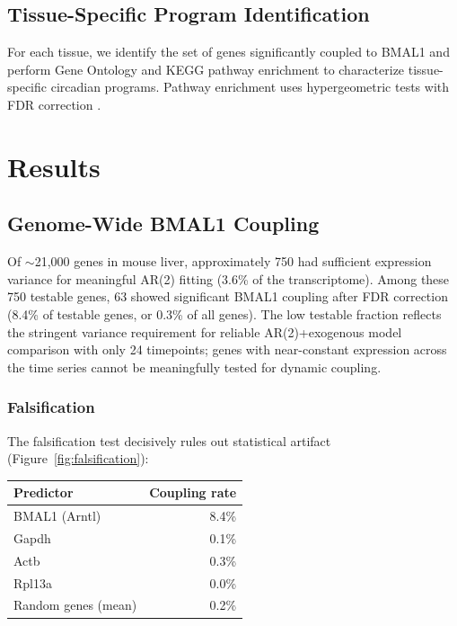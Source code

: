 \documentclass[11pt,letterpaper]{article}
\begin{document}
\subsection{Tissue-Specific Program Identification}

For each tissue, we identify the set of genes significantly coupled to BMAL1 and perform Gene Ontology and KEGG pathway enrichment to characterize tissue-specific circadian programs. Pathway enrichment uses hypergeometric tests with FDR correction \citep{benjamini1995controlling}.

\section{Results}

\subsection{Genome-Wide BMAL1 Coupling}

Of $\sim$21,000 genes in mouse liver, approximately 750 had sufficient expression variance for meaningful AR(2) fitting (3.6\% of the transcriptome). Among these 750 testable genes, 63 showed significant BMAL1 coupling after FDR correction (8.4\% of testable genes, or 0.3\% of all genes). The low testable fraction reflects the stringent variance requirement for reliable AR(2)+exogenous model comparison with only 24 timepoints; genes with near-constant expression across the time series cannot be meaningfully tested for dynamic coupling.

\subsubsection{Falsification}

The falsification test decisively rules out statistical artifact (Figure~\ref{fig:falsification}):

\begin{center}
\begin{tabular}{lr}
\toprule
\textbf{Predictor} & \textbf{Coupling rate} \\
\midrule
BMAL1 (Arntl) & 8.4\% \\
Gapdh & 0.1\% \\
Actb & 0.3\% \\
Rpl13a & 0.0\% \\
Random genes (mean) & 0.2\% \\
\bottomrule
\end{tabular}
\end{center}
\end{document}
